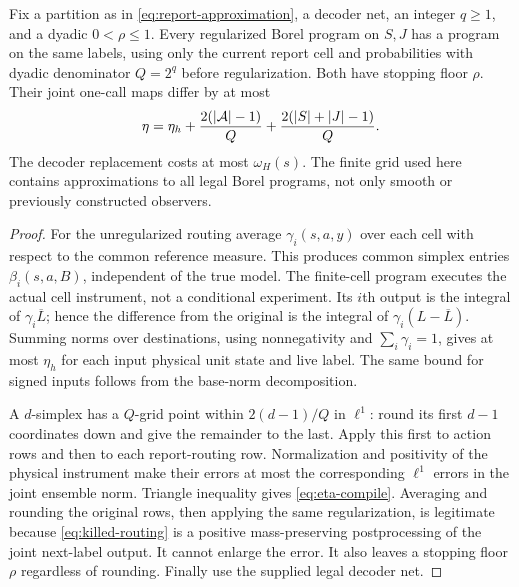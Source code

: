 \begin{lemma}\label{lem:finite-routing}
Fix a partition as in \eqref{eq:report-approximation}, a decoder net, an integer $q\ge1$, and a dyadic $0<\rho\le1$. Every regularized Borel program on $S,J$ has a program on the same labels, using only the current report cell and probabilities with dyadic denominator $Q=2^q$ before regularization. Both have stopping floor $\rho$. Their joint one-call maps differ by at most
\begin{equation}\label{eq:eta-compile}
 \eta=\eta_h+\frac{2(|\mathcal A|-1)}{Q}
                      +\frac{2(|S|+|J|-1)}{Q}.
\end{equation}
The decoder replacement costs at most $\omega_H(s)$. The finite grid used here contains approximations to all legal Borel programs, not only smooth or previously constructed observers.
\end{lemma}
\begin{proof}
For the unregularized routing average $\gamma_i(s,a,y)$ over each cell with respect to the common reference measure. This produces common simplex entries $\beta_i(s,a,B)$, independent of the true model. The finite-cell program executes the actual cell instrument, not a conditional experiment. Its $i$th output is the integral of $\gamma_i\overline L$; hence the difference from the original is the integral of $\gamma_i(L-\overline L)$. Summing norms over destinations, using nonnegativity and $\sum_i\gamma_i=1$, gives at most $\eta_h$ for each input physical unit state and live label. The same bound for signed inputs follows from the base-norm decomposition.

A $d$-simplex has a $Q$-grid point within $2(d-1)/Q$ in $\ell^1$: round its first $d-1$ coordinates down and give the remainder to the last. Apply this first to action rows and then to each report-routing row. Normalization and positivity of the physical instrument make their errors at most the corresponding $\ell^1$ errors in the joint ensemble norm. Triangle inequality gives \eqref{eq:eta-compile}. Averaging and rounding the original rows, then applying the same regularization, is legitimate because \eqref{eq:killed-routing} is a positive mass-preserving postprocessing of the joint next-label output. It cannot enlarge the error. It also leaves a stopping floor $\rho$ regardless of rounding. Finally use the supplied legal decoder net.
\end{proof}

